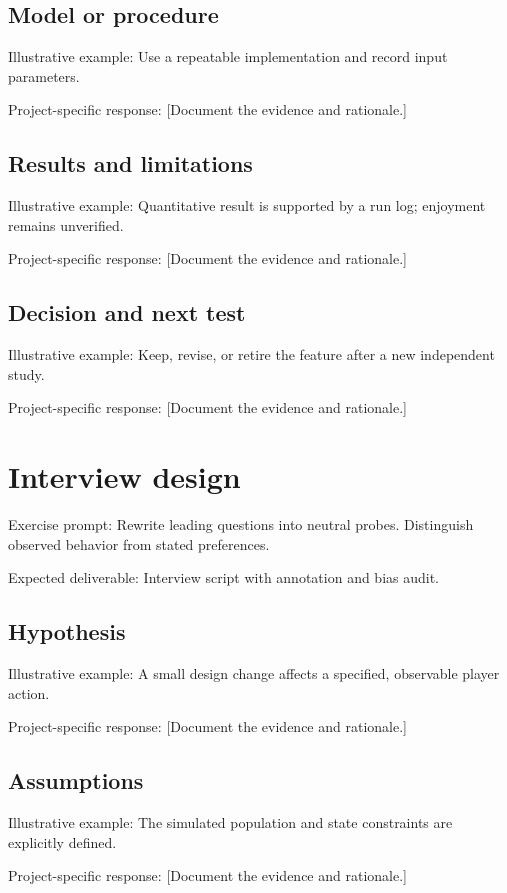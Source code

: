 \documentclass[11pt]{article}
\begin{document}
\subsection{Model or procedure}
Illustrative example: Use a repeatable implementation and record input parameters.

Project-specific response: [Document the evidence and rationale.]


\subsection{Results and limitations}
Illustrative example: Quantitative result is supported by a run log; enjoyment remains unverified.

Project-specific response: [Document the evidence and rationale.]


\subsection{Decision and next test}
Illustrative example: Keep, revise, or retire the feature after a new independent study.

Project-specific response: [Document the evidence and rationale.]


\section{Interview design}
Exercise prompt: Rewrite leading questions into neutral probes. Distinguish observed behavior from stated preferences.

Expected deliverable: Interview script with annotation and bias audit.


\subsection{Hypothesis}
Illustrative example: A small design change affects a specified, observable player action.

Project-specific response: [Document the evidence and rationale.]


\subsection{Assumptions}
Illustrative example: The simulated population and state constraints are explicitly defined.

Project-specific response: [Document the evidence and rationale.]
\end{document}
